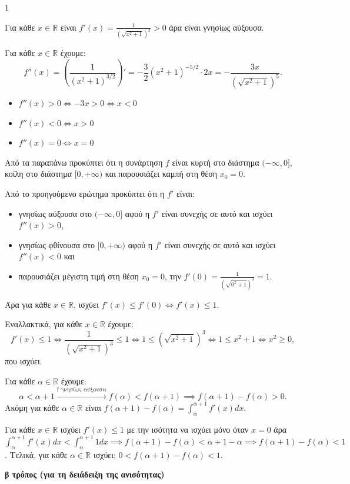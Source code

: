 \begin{ylh}{1}
    \item [Ύλη από εικόνα]
\end{ylh}
Για κάθε $x \in \mathbb{R}$ είναι $f'(x) = \frac{1}{\left(\sqrt{x^2+1}\right)^3} > 0$ άρα είναι γνησίως αύξουσα.

\begin{alist}
    \item [α)] Για κάθε $x \in \mathbb{R}$ έχουμε:
    \[ f''(x) = \left( \frac{1}{\left(x^2+1\right)^{3/2}} \right)' = -\frac{3}{2}\left(x^2+1\right)^{-5/2} \cdot 2x = -\frac{3x}{\left(\sqrt{x^2+1}\right)^5}. \]
    \begin{itemize}
        \item $f''(x) > 0 \iff -3x > 0 \iff x < 0$
        \item $f''(x) < 0 \iff x > 0$
        \item $f''(x) = 0 \iff x = 0$
    \end{itemize}
    Από τα παραπάνω προκύπτει ότι η συνάρτηση $f$ είναι κυρτή στο διάστημα $(-\infty, 0]$, κοίλη στο διάστημα $[0, +\infty)$ και παρουσιάζει καμπή στη θέση $x_0 = 0$.

    \item [β)] Από το προηγούμενο ερώτημα προκύπτει ότι η $f'$ είναι:
    \begin{itemize}
        \item γνησίως αύξουσα στο $(-\infty, 0]$ αφού η $f'$ είναι συνεχής σε αυτό και ισχύει $f''(x) > 0$,
        \item γνησίως φθίνουσα στο $[0, +\infty)$ αφού η $f'$ είναι συνεχής σε αυτό και ισχύει $f''(x) < 0$ και
        \item παρουσιάζει μέγιστη τιμή στη θέση $x_0 = 0$, την $f'(0) = \frac{1}{\left(\sqrt{0^2+1}\right)^3} = 1$.
    \end{itemize}
    Άρα για κάθε $x \in \mathbb{R}$, ισχύει $f'(x) \leq f'(0) \iff f'(x) \leq 1$.

    Εναλλακτικά, για κάθε $x \in \mathbb{R}$ έχουμε:
    \[ f'(x) \leq 1 \iff \frac{1}{\left(\sqrt{x^2+1}\right)^3} \leq 1 \iff 1 \leq \left(\sqrt{x^2+1}\right)^3 \iff 1 \leq x^2+1 \iff x^2 \geq 0, \]
    που ισχύει.

    \item [γ)]
    \begin{rlist}
        \item Για κάθε $\alpha \in \mathbb{R}$ έχουμε:
        \[ \alpha < \alpha+1 \xrightarrow{\text{f γνησίως αύξουσα}} f(\alpha) < f(\alpha+1) \implies f(\alpha+1)-f(\alpha) > 0. \]
        Ακόμη για κάθε $\alpha \in \mathbb{R}$ είναι $f(\alpha+1)-f(\alpha) = \int_{\alpha}^{\alpha+1} f'(x)dx$.

        \item Για κάθε $x \in \mathbb{R}$ ισχύει $f'(x) \leq 1$ με την ισότητα να ισχύει μόνο όταν $x=0$ άρα $\int_{\alpha}^{\alpha+1} f'(x)dx < \int_{\alpha}^{\alpha+1} 1dx \implies f(\alpha+1)-f(\alpha) < \alpha+1-\alpha \implies f(\alpha+1)-f(\alpha) < 1$.
        Τελικά, για κάθε $\alpha \in \mathbb{R}$ ισχύει: $0 < f(\alpha+1)-f(\alpha) < 1$.
    \end{rlist}
\end{alist}
\textbf{β τρόπος (για τη δειάδειξη της ανισότητας)}

